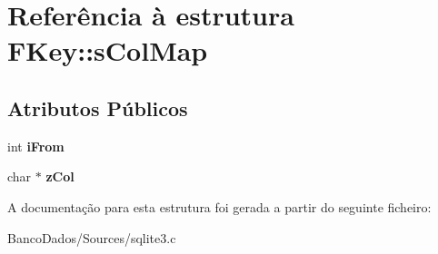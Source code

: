 \hypertarget{struct_f_key_1_1s_col_map}{\section{Referência à estrutura F\-Key\-:\-:s\-Col\-Map}
\label{struct_f_key_1_1s_col_map}
}
\subsection*{Atributos Públicos}
\begin{DoxyCompactItemize}
\item 
\hypertarget{struct_f_key_1_1s_col_map_a2b0ed19d4924a93d1f3f14f891b176ed}{int {\bfseries i\-From}}\label{struct_f_key_1_1s_col_map_a2b0ed19d4924a93d1f3f14f891b176ed}

\item 
\hypertarget{struct_f_key_1_1s_col_map_a4cdef475be73cc460873051a2c2c2937}{char $\ast$ {\bfseries z\-Col}}\label{struct_f_key_1_1s_col_map_a4cdef475be73cc460873051a2c2c2937}

\end{DoxyCompactItemize}


A documentação para esta estrutura foi gerada a partir do seguinte ficheiro\-:\begin{DoxyCompactItemize}
\item 
Banco\-Dados/\-Sources/sqlite3.\-c\end{DoxyCompactItemize}
